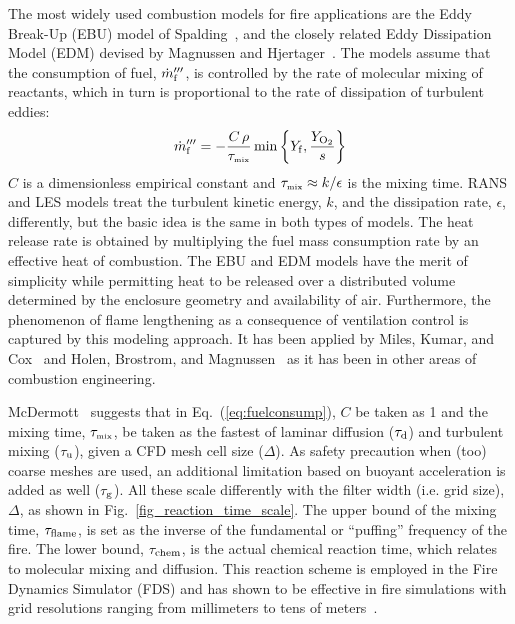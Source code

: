 \documentclass[graybox]{svmult}
\begin{document}
The most widely used combustion models for fire applications are the Eddy Break-Up (EBU) model of Spalding~\cite{Spalding:1971}, and the closely related Eddy Dissipation Model (EDM) devised by Magnussen and Hjertager~\cite{Magnussen}. The models assume that the consumption of fuel, $\dot{m}_{\rm f}'''$, is controlled by the rate of molecular mixing of reactants, which in turn is proportional to the rate of dissipation of turbulent eddies:
\begin{equation}
\dot{m}_{\rm f}''' = - \frac{C \, \rho}{\tau_{\hbox{\tiny mix}}} \min \left\{ Y_{\rm f}, \frac{Y_{\mathrm{O_2}}}{s} \right\}
\label{eq:fuelconsump}
\end{equation}
$C$ is a dimensionless empirical constant and $\tau_{\hbox{\tiny mix}} \approx k/\epsilon$ is the mixing time. RANS and LES models treat the turbulent kinetic energy, $k$, and the dissipation rate, $\epsilon$, differently, but the basic idea is the same in both types of models. The heat release rate is obtained by multiplying the fuel mass consumption rate by an effective heat of combustion. The EBU and EDM models have the merit of simplicity while permitting heat to be released over a distributed volume determined by the enclosure geometry and availability of air. Furthermore, the phenomenon of flame lengthening as a consequence of ventilation control is captured by this modeling approach. It has been applied by Miles, Kumar, and Cox~\cite{Miles} and Holen, Brostrom, and Magnussen~\cite{Holen} as it has been in other areas of combustion engineering.

McDermott~\cite{McDermott:2011} suggests that in Eq.~(\ref{eq:fuelconsump}), $C$ be taken as 1 and the mixing time, $\tau_{\hbox{\tiny mix}}$, be taken as the fastest of laminar diffusion ($\tau_{\rm d}$) and turbulent mixing ($\tau_{\rm u}$), given a CFD mesh cell size ($\Delta$). As safety precaution when (too) coarse meshes are used, an additional limitation based on buoyant acceleration is added as well ($\tau_{\rm g}$). All these scale differently with the filter width (i.e. grid size), $\Delta$, as shown in Fig.~\ref{fig_reaction_time_scale}. The upper bound of the mixing time, $\tau_{\rm flame}$, is set as the inverse of the fundamental or ``puffing'' frequency of the fire. The lower bound, $\tau_{\rm chem}$, is the actual chemical reaction time, which relates to molecular mixing and diffusion. This reaction scheme is employed in the Fire Dynamics Simulator (FDS) and has shown to be effective in fire simulations with grid resolutions ranging from millimeters to tens of meters~\cite{FDS_Validation_Guide}.
\end{document}
